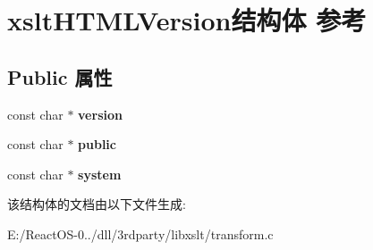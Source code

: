 \hypertarget{structxslt_h_t_m_l_version}{}\section{xslt\+H\+T\+M\+L\+Version结构体 参考}
\label{structxslt_h_t_m_l_version}
\subsection*{Public 属性}
\begin{DoxyCompactItemize}
\item 
\mbox{\label{structxslt_h_t_m_l_version_ac537e5c2495b6fa99f95de25acda0036}} 
const char $\ast$ {\bfseries version}
\item 
\mbox{\label{structxslt_h_t_m_l_version_aec8da52cd16efc28b2f9d3e5de4afb0d}} 
const char $\ast$ {\bfseries public}
\item 
\mbox{\label{structxslt_h_t_m_l_version_a2abf0e0a0387c3e1f070cb08922f704c}} 
const char $\ast$ {\bfseries system}
\end{DoxyCompactItemize}


该结构体的文档由以下文件生成\+:\begin{DoxyCompactItemize}
\item 
E\+:/\+React\+O\+S-\/0../dll/3rdparty/libxslt/transform.\+c\end{DoxyCompactItemize}
